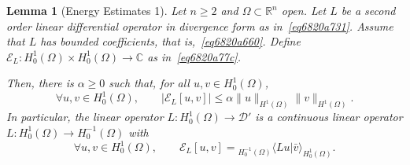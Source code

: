 \documentclass[a4paper,9pt]{amsart}
\newcommand{\scr}[1]{\mathscr{#1}}
\newcommand{\R}{\mathbb{R}}	%
\newcommand{\C}{\mathbb{C}}	%
\theoremstyle{plain}
\newtheorem{lemma}[proposition]{Lemma}
\theoremstyle{definition}
\theoremstyle{remark}
\begin{document}
\begin{lemma}[Energy Estimates 1]\label{lem6821a526}
	Let $n\ge2$ and $\Omega\subset\R^n$ open.
	Let $L$ be a second order linear differential operator in divergence form as in~\eqref{eq6820a731}.
	Assume that $L$ has bounded coefficients, that is,~\eqref{eq6820a660}.
	Define $\scr E_L:H^1_0(\Omega)\times H^1_0(\Omega)\to\C$ as in~\eqref{eq6820a77c}.
	
	Then, there is $\alpha\ge0$ such that, for all $u,v\in H^1_0(\Omega)$,
	\begin{equation}\label{eq6820a83b}
		\forall u,v\in H^1_0(\Omega),\qquad
		|\scr E_L[u,v]| \le \alpha \|u\|_{H^1(\Omega)} \|v\|_{H^1(\Omega)} .
	\end{equation}
	In particular, the linear operator $L:H^1_0(\Omega)\to\scr D'$ is a continuous linear operator $L:H^1_0(\Omega)\to H^{-1}_0(\Omega)$ with
	\begin{equation}\label{eq6821fcc1}
		\forall u,v\in H^1_0(\Omega),\qquad
		\scr E_L[u,v] = {}_{H^{-1}_0(\Omega)} \langle Lu | \bar v \rangle_{H^1_0(\Omega)} .
	\end{equation}
\end{lemma}
\end{document}
